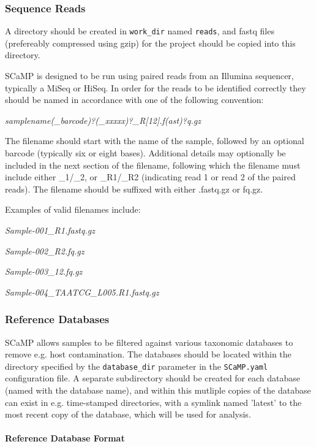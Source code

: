 \documentclass[a4paper,10pt]{article}
\newenvironment{tight_itemize}{
\begin{itemize}
  \setlength{\itemsep}{0pt}
  \setlength{\parskip}{0pt}
}{\end{itemize}}
\newcommand{\para}[1]{\paragraph{#1}\mbox{}\\}
\begin{document}
\subsubsection{Sequence Reads}

A directory should be created in {\tt work\_dir} named {\tt reads}, and fastq
files (prefereably compressed using gzip) for the project should be copied into
this directory.

SCaMP is designed to be run using paired reads from an Illumina sequencer,
typically a MiSeq or HiSeq. In order for the reads to be identified correctly
they should be named in accordance with one of the following convention:

\textit{samplename(\_barcode)?(\_xxxxx)?\_R[12].f(ast)?q.gz}

The filename should start with the name of the sample, followed by an optional
barcode (typically six or eight bases). Additional details may optionally be
included in the next section of the filename, following which the filename must
include either \_1/\_2, or \_R1/\_R2 (indicating read 1 or read 2 of the paired
reads). The filename should be suffixed with either .fastq.gz or fq.gz.

Examples of valid filenames include:
\begin{tight_itemize}
\item \textit{Sample-001\_R1.fastq.gz}
\item \textit{Sample-002\_R2.fq.gz}
\item \textit{Sample-003\_12.fq.gz}
\item \textit{Sample-004\_TAATCG\_L005.R1.fastq.gz}
\end{tight_itemize}

\subsubsection{Reference Databases}

SCaMP allows samples to be filtered against various taxonomic databases to
remove e.g. host contamination. The databases should be located within the
directory specified by the {\tt database\_dir} parameter in the {\tt SCaMP.yaml}
configuration file. A separate subdirectory should be created for each database
(named with the database name), and within this mutliple copies of the database
can exist in e.g. time-stamped directories, with a symlink named 'latest' to
the most recent copy of the database, which will be used for analysis.

\para{Reference Database Format}
\end{document}
